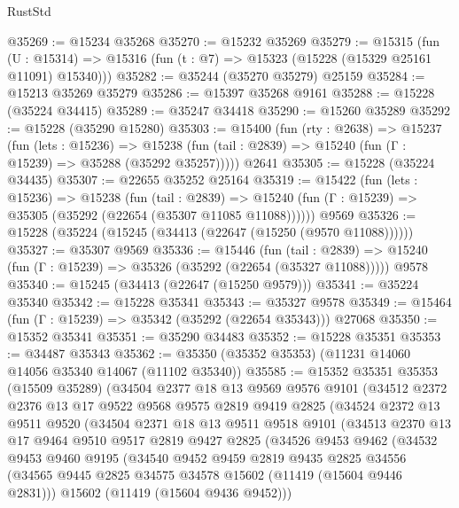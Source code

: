 \begin{lexlean}{RustStd}
\begin{coremodule}
@35269 := @15234 @35268
@35270 := @15232 @35269
@35279 := @15315
    (fun (U : @15314) => @15316 (fun (t : @7) => @15323 (@15228 (@15329 @25161 @11091) @15340)))
@35282 := @35244 (@35270 @35279) @25159
@35284 := @15213 @35269 @35279
@35286 := @15397 @35268 @9161
@35288 := @15228 (@35224 @34415)
@35289 := @35247 @34418
@35290 := @15260 @35289
@35292 := @15228 (@35290 @15280)
@35303 := @15400
    (fun (rty : @2638) =>
    @15237
      (fun (lets : @15236) =>
      @15238 (fun (tail : @2839) => @15240 (fun (Γ : @15239) => @35288 (@35292 @35257)))))
    @2641
@35305 := @15228 (@35224 @34435)
@35307 := @22655 @35252 @25164
@35319 := @15422
    (fun (lets : @15236) =>
    @15238
      (fun (tail : @2839) =>
      @15240 (fun (Γ : @15239) => @35305 (@35292 (@22654 (@35307 @11085 @11088))))))
    @9569
@35326 := @15228 (@35224 (@15245 (@34413 (@22647 (@15250 (@9570 @11088))))))
@35327 := @35307 @9569
@35336 := @15446
    (fun (tail : @2839) => @15240 (fun (Γ : @15239) => @35326 (@35292 (@22654 (@35327 @11088)))))
    @9578
@35340 := @15245 (@34413 (@22647 (@15250 @9579)))
@35341 := @35224 @35340
@35342 := @15228 @35341
@35343 := @35327 @9578
@35349 := @15464 (fun (Γ : @15239) => @35342 (@35292 (@22654 @35343))) @27068
@35350 := @15352 @35341
@35351 := @35290 @34483
@35352 := @15228 @35351
@35353 := @34487 @35343
@35362 := @35350 (@35352 @35353) (@11231 @14060 @14056 @35340 @14067 (@11102 @35340))
@35585 := @15352
    @35351
    @35353
    (@15509 @35289)
    (@34504
      @2377
      @18
      @13
      @9569
      @9576
      @9101
      (@34512
        @2372
        @2376
        @13
        @17
        @9522
        @9568
        @9575
        @2819
        @9419
        @2825
        (@34524
          @2372
          @13
          @9511
          @9520
          (@34504
            @2371
            @18
            @13
            @9511
            @9518
            @9101
            (@34513
              @2370
              @13
              @17
              @9464
              @9510
              @9517
              @2819
              @9427
              @2825
              (@34526
                @9453
                @9462
                (@34532
                  @9453
                  @9460
                  @9195
                  (@34540
                    @9452
                    @9459
                    @2819
                    @9435
                    @2825
                    @34556
                    (@34565 @9445 @2825 @34575 @34578 @15602 (@11419 (@15604 @9446 @2831)))
                    @15602
                    (@11419 (@15604 @9436 @9452)))

\end{coremodule}
\end{lexlean}
